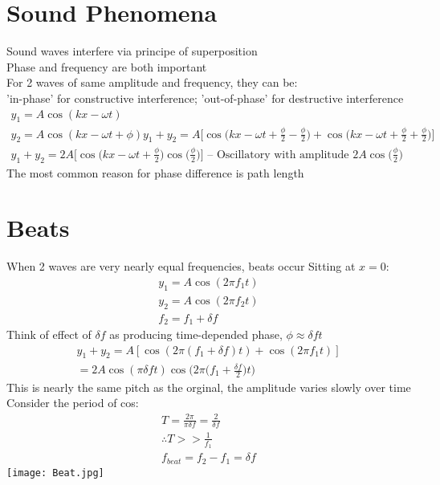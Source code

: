 \documentclass[a4paper, 11pt, fleqn, normalem]{report}
\begin{document}
\section{Sound Phenomena}
Sound waves interfere via principe of superposition \\
Phase and frequency are both important \\
For 2 waves of same amplitude and frequency, they can be: \\
'in-phase' for constructive interference; 'out-of-phase' for destructive interference
\begin{gather*}
    y_{1} = A\cos{(kx - \omega t)} \\
    y_{2} = A\cos{(kx - \omega t + \phi)}
    y_{1} + y_{2} = A\Big[\cos{\Big(kx - \omega t + \frac{\phi}{2} - \frac{\phi}{2}\Big)} + \cos{\Big(kx - \omega t + \frac{\phi}{2} + \frac{\phi}{2}\Big)}\Big] \\
    y_{1} + y_{2} = 2A\Big[\cos{\Big(kx - \omega t + \frac{\phi}{2}\Big)}\cos{\Big(\frac{\phi}{2}\Big)}\Big]\text{ -- Oscillatory with amplitude }2A\cos{\Big(\frac{\phi}{2}\Big)}
\end{gather*}
The most common reason for phase difference is path length

\section{Beats}
When 2 waves are very nearly equal frequencies, beats occur
Sitting at $x = 0$:
\begin{gather*}
    y_{1} = A\cos{(2\pi f_{1}t)} \\
    y_{2} = A\cos{(2\pi f_{2}t)} \\
    f_{2} = f_{1} + \delta f
\end{gather*}
Think of effect of $\delta f$ as producing time-depended phase, $\phi \approx \delta ft$
\begin{gather*}
    y_{1} + y_{2} = A[\cos{(2\pi(f_{1} + \delta f)t)} + \cos{(2\pi f_{1}t)}] \\
    = 2A\cos{(\pi\delta ft)}\cos{\Big(2\pi\Big(f_{1} + \frac{\delta f}{2}\Big)t\Big)}
\end{gather*}
This is nearly the same pitch as the orginal, the amplitude varies slowly over time \\
Consider the period of cos:
\begin{gather*}
    T = \frac{2\pi}{\pi\delta f} = \frac{2}{\delta f} \\
    \therefore T >> \frac{1}{f_{1}} \\
    f_{beat} = f_{2} - f_{1} = \delta f
\end{gather*}
\texttt{[image: Beat.jpg]}
\end{document}
